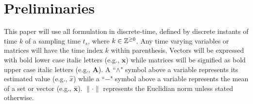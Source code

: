 
\section{Preliminaries} \label{sec:preliminaries}

 This paper will use all formulation in discrete-time, defined by discrete instants of time $k$ of a sampling time $t_s$, where $k \in \mathbb{Z}^{\geq0}$. Any time varying variables or matrices will have the time index $k$ within parenthesis. Vectors will be expressed with bold lower case italic letters (e.g., $\bm{x}$) while matrices will be signified as bold upper case italic letters (e.g., $\bm{A}$). A ``$\wedge$" symbol above a variable represents its estimated value (e.g., $\hat{x}$) while a ``$-$" symbol above a variable represents the mean of a set or vector (e.g., $\bar{\bm{x}}$). $\lVert\cdot\rVert$ represents the Euclidian norm unless stated otherwise.

